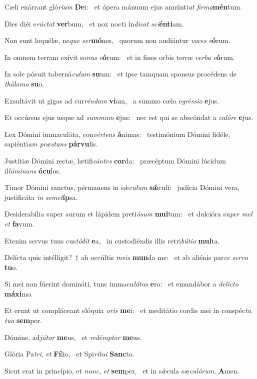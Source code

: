 \item Cæli enárrant gló\textit{riam} \textbf{De}i:~\psstar{} et ópera mánuum ejus annúnti\textit{at} \textit{firma}\textbf{mén}tum.
\item Dies diéi e\textit{rúctat} \textbf{ver}bum,~\psstar{} et nox nocti ín\textit{dicat} \textit{sci}\textbf{én}\textbf{ti}am.
\item Non sunt loquélæ, ne\textit{que} \textit{ser}\textbf{mó}nes,~\psstar{} quorum non audiántur \textit{voces} \textit{e}\textbf{ó}rum.
\item In omnem terram exívit so\textit{nus} \textit{e}\textbf{ó}rum:~\psstar{} et in fines orbis terræ \textit{verba} \textit{e}\textbf{ó}rum.
\item In sole pósuit taberná\textit{culum} \textbf{su}um:~\psstar{} et ipse tamquam sponsus procédens de \textit{thálamo} \textbf{su}o.
\item Exsultávit ut gigas ad cur\textit{réndam} \textbf{vi}am,~\psstar{} a summo cælo e\textit{gréssio} \textbf{e}jus.
\item Et occúrsus ejus usque ad \textit{summum} \textbf{e}jus:~\psstar{} nec est qui se abscóndat a \textit{calóre} \textbf{e}jus.
\item Lex Dómini immaculáta, con\textit{vértens} \textbf{á}nimas:~\psstar{} testimónium Dómini fidéle, sapiénti\textit{am} \textit{præstans} \textbf{pár}\textbf{vu}lis.
\item Justítiæ Dómini rectæ, lætifi\textit{cántes} \textbf{cor}da:~\psstar{} præcéptum Dómini lúcidum il\textit{lúminans} \textbf{ó}\textbf{cu}los.
\item Timor Dómini sanctus, pérmanens in sǽ\textit{culum} \textbf{sǽ}culi:~\psstar{} judícia Dómini vera, justificáta \textit{in} \textit{semet}\textbf{íp}sa.
\item Desiderabília super aurum et lápidem preti\textit{ósum} \textbf{mul}tum:~\psstar{} et dulcióra su\textit{per} \textit{mel} \textit{et} \textbf{fa}vum.
\item Etenim servus tuus cus\textit{tódit} \textbf{e}a,~\psstar{} in custodiéndis illis retri\textit{bútio} \textbf{mul}ta.
\item Delícta quis intélligit?~† ab occúltis \textit{meis} \textbf{mun}da me:~\psstar{} et ab aliénis par\textit{ce} \textit{servo} \textbf{tu}o.
\item Si mei non fúerint domináti, tunc immacu\textit{látus} \textbf{e}ro:~\psstar{} et emundábor a \textit{delícto} \textbf{má}\textbf{xi}mo.
\item Et erunt ut compláceant elóquia \textit{oris} \textbf{me}i:~\psstar{} et meditátio cordis mei in conspéc\textit{tu} \textit{tuo} \textbf{sem}per.
\item Dómine, ad\textit{jútor} \textbf{me}us,~\psstar{} et \textit{redémptor} \textbf{me}us.
\item Glória Pa\textit{tri}, \textit{et} \textbf{Fí}lio,~\psstar{} et Spi\textit{rítui} \textbf{Sanc}to.
\item Sicut erat in princípio, et \textit{nunc}, \textit{et} \textbf{sem}per,~\psstar{} et in sǽcula sæ\textit{culórum}. \textbf{A}men.
